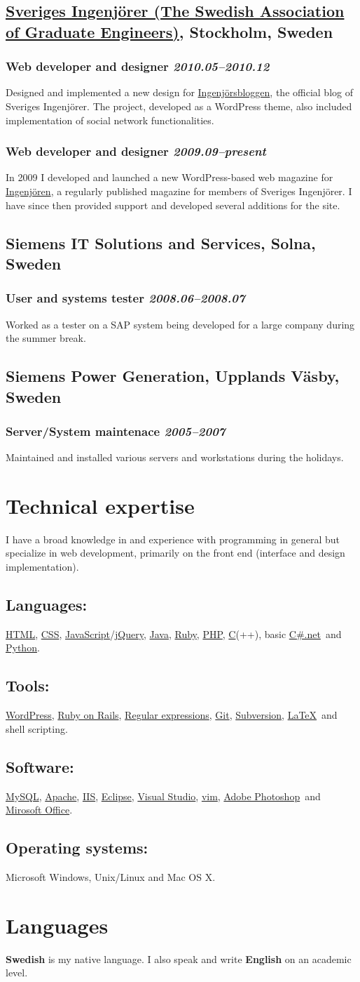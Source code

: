 \documentclass[a4paper,11pt]{article}
\newcommand{\icon}[1]{\textcolor{lightgray}{#1}}
\newcommand{\iconl}[1]{\hspace{-0.5cm}\makebox[0.3cm][c]{\icon{#1}}\hspace{0.2cm}}
\newcommand{\worktitle}[1]{\textbf{#1}}
\newcommand{\duration}[1]{\textsl{#1}}
\newcommand{\theplace}[2][]{\subsection*{\textbf{#2}#1}}
\newcommand{\thework}[2]{\subsubsection*{%
  \iconl{$\blacksquare$}%
  \worktitle{#1}%
  \hfill\duration{#2}}\par%
}
\newcommand{\thebold}[1]{\subsection*{\textbf{#1}}\vspace{-1mm}}
\def\html{\href{http://en.wikipedia.org/wiki/HTML}{HTML}}
\def\javascript{\href{http://en.wikipedia.org/wiki/JavaScript}{JavaScript}}
\def\css{\href{http://en.wikipedia.org/wiki/Cascading_Style_Sheets}{CSS}}
\def\clang{\href{http://en.wikipedia.org/wiki/C_\%28programming_language\%29}{C}}
\def\regex{\href{http://en.wikipedia.org/wiki/Regular_expressions}{Regular expressions}}
\def\git{\href{http://git-scm.com/}{Git}}
\def\svn{\href{http://subversion.apache.org/}{Subversion}}
\def\jquery{\href{http://jquery.com/}{jQuery}}
\def\wordpress{\href{http://wordpress.org}{WordPress}}
\def\ror{\href{http://rubyonrails.org}{Ruby on Rails}}
\def\java{\href{http://www.java.com/}{Java}}
\def\php{\href{http://php.net}{PHP}}
\def\ruby{\href{http://www.ruby-lang.org/}{Ruby}}
\def\csharp{\href{http://en.wikipedia.org/wiki/C_Sharp_\%28programming_language\%29}{C\#.net}}
\def\python{\href{http://www.python.org/}{Python}}
\def\mysql{\href{http://www.mysql.com/}{MySQL}}
\def\apache{\href{http://httpd.apache.org/}{Apache}}
\def\iis{\href{http://www.iis.net/}{IIS}}
\def\eclipse{\href{http://www.eclipse.org/eclipse/}{Eclipse}}
\def\vs{\href{http://www.microsoft.com/visualstudio/}{Visual Studio}}
\def\vim{\href{http://www.vim.org/}{vim}}
\def\photoshop{\href{http://www.adobe.com/products/photoshop.html}{Adobe Photoshop}}
\def\office{\href{http://office.microsoft.com/}{Mirosoft Office}}
\def\latex{\href{http://en.wikipedia.org/wiki/LaTeX}{LaTeX}}
\begin{document}
\theplace[, Stockholm, Sweden]{\href{http://www.sverigesingenjorer.se}{Sveriges Ingenjörer (The Swedish Association of Graduate Engineers)}}

\thework{Web developer and designer}{2010.05--2010.12}
Designed and implemented a new design for \href{http://www.ingenjorsbloggen.se}{Ingenjörsbloggen}, the official blog of Sveriges Ingenjörer. The project, developed as a WordPress theme, also included implementation of social network functionalities.

\thework{Web developer and designer}{2009.09--present}
In 2009 I developed and launched a new WordPress-based web magazine for \href{http://www.ingenjoren.se}{Ingenjören}, a regularly published magazine for members of Sveriges Ingenjörer. I have since then provided support and developed several additions for the site.

\theplace[, Solna, Sweden]{Siemens IT Solutions and Services}

\thework{User and systems tester}{2008.06--2008.07}
Worked as a tester on a SAP system being developed for a large company during the summer break.

\theplace[, Upplands Väsby, Sweden]{Siemens Power Generation}

\thework{Server/System maintenace}{2005--2007}
Maintained and installed various servers and workstations during the holidays.
\section*{Technical expertise}%
I have a broad knowledge in and experience with programming in general but specialize in web development, primarily on the front end (interface and design implementation).

\thebold{Languages:} \html, \css, \javascript/\jquery, \java, \ruby, \php, \clang(++), basic \csharp\ and \python.

\thebold{Tools:} \wordpress, \ror, \regex, \git, \svn, \latex\ and shell scripting.

\thebold{Software:} \mysql, \apache, \iis, \eclipse, \vs, \vim, \photoshop\ and \office.

\thebold{Operating systems:} Microsoft Windows, Unix/Linux and Mac OS X.
\section*{Languages}%
\textbf{Swedish} is my native language. I also speak and write \textbf{English} on an academic level.
\end{document}
